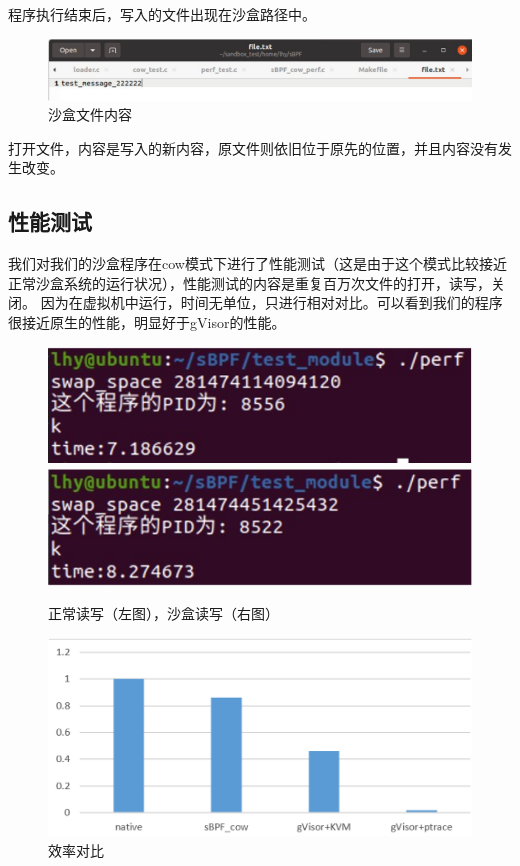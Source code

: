 \documentclass[AutoFakeBold,a4paper]{ctexart}
\begin{document}
程序执行结束后，写入的文件出现在沙盒路径中。

\begin{figure}[H]
    \centering
    \includegraphics[width=\columnwidth]{pic9.png}
    \caption{沙盒文件内容}
\end{figure}

打开文件，内容是写入的新内容，原文件则依旧位于原先的位置，并且内容没有发生改变。

\subsection{性能测试}
我们对我们的沙盒程序在cow模式下进行了性能测试（这是由于这个模式比较接近正常沙盒系统的运行状况），性能测试的内容是重复百万次文件的打开，读写，关闭。
因为在虚拟机中运行，时间无单位，只进行相对对比。可以看到我们的程序很接近原生的性能，明显好于gVisor的性能\cite{234857}。

\begin{figure}[H]
    \centering
    \includegraphics[width=0.49\columnwidth]{pic11.png}
    \includegraphics[width=0.49\columnwidth]{pic12.png}
    \caption{正常读写（左图），沙盒读写（右图）}
\end{figure}

\begin{figure}[H]
    \centering
    \includegraphics[width=\columnwidth]{pic13.png}
    \caption{效率对比}
\end{figure}
\end{document}
